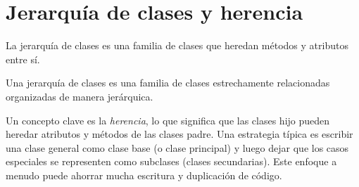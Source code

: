 \chapter{Jerarquía de clases y herencia}

La jerarquía de clases es una familia de clases que heredan métodos y
atributos entre sí.

Una jerarquía de clases es una familia de clases estrechamente
relacionadas organizadas de manera jerárquica.

Un concepto clave es la \emph{herencia}, lo que significa que las clases
hijo pueden heredar atributos y métodos de las clases padre. Una
estrategia típica es escribir una clase general como clase base (o clase
principal) y luego dejar que los casos especiales se representen como
subclases (clases secundarias). Este enfoque a menudo puede ahorrar
mucha escritura y duplicación de código.\\

